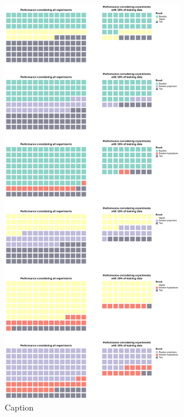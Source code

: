 \begin{figure}
    \centering
    \includegraphics[width=0.7\textwidth]{thesis/Figures/invariants_performance.png}
    \caption{Caption}
    \label{fig:invariants_performance}
\end{figure}